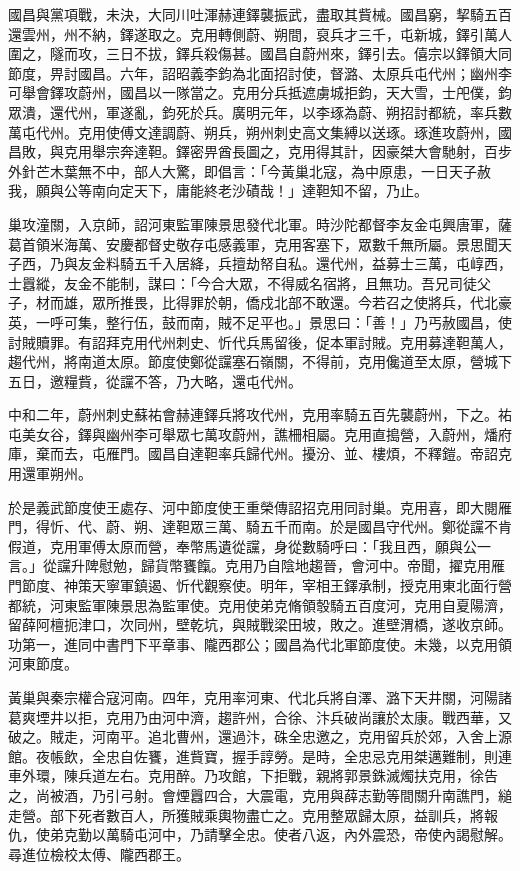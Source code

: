 \begin{pinyinscope}
 國昌與黨項戰，未決，大同川吐渾赫連鐸襲振武，盡取其貲械。國昌窮，挈騎五百還雲州，州不納，鐸遂取之。克用轉側蔚、朔間，裒兵才三千，屯新城，鐸引萬人圍之，隧而攻，三日不拔，鐸兵殺傷甚。國昌自蔚州來，鐸引去。僖宗以鐸領大同節度，畀討國昌。六年，詔昭義李鈞為北面招討使，督潞、太原兵屯代州；幽州李可舉會鐸攻蔚州，國昌以一隊當之。克用分兵抵遮虜城拒鈞，天大雪，士戺僕，鈞眾潰，還代州，軍遂亂，鈞死於兵。廣明元年，以李琢為蔚、朔招討都統，率兵數萬屯代州。克用使傅文達調蔚、朔兵，朔州刺史高文集縛以送琢。琢進攻蔚州，國昌敗，與克用舉宗奔達靼。鐸密畀酋長圖之，克用得其計，因豪桀大會馳射，百步外針芒木葉無不中，部人大驚，即倡言：「今黃巢北寇，為中原患，一日天子赦我，願與公等南向定天下，庸能終老沙磧哉！」達靼知不留，乃止。



 巢攻潼關，入京師，詔河東監軍陳景思發代北軍。時沙陀都督李友金屯興唐軍，薩葛首領米海萬、安慶都督史敬存屯感義軍，克用客塞下，眾數千無所屬。景思聞天子西，乃與友金料騎五千入居絳，兵擅劫帑自私。還代州，益募士三萬，屯崞西，士囂縱，友金不能制，謀曰：「今合大眾，不得威名宿將，且無功。吾兄司徒父子，材而雄，眾所推畏，比得罪於朝，僑戍北部不敢還。今若召之使將兵，代北豪英，一呼可集，整行伍，鼓而南，賊不足平也。」景思曰：「善！」乃丐赦國昌，使討賊贖罪。有詔拜克用代州刺史、忻代兵馬留後，促本軍討賊。克用募達靼萬人，趨代州，將南道太原。節度使鄭從讜塞石嶺關，不得前，克用儳道至太原，營城下五日，邀糧貲，從讜不答，乃大略，還屯代州。



 中和二年，蔚州刺史蘇祐會赫連鐸兵將攻代州，克用率騎五百先襲蔚州，下之。祐屯美女谷，鐸與幽州李可舉眾七萬攻蔚州，譙柵相屬。克用直搗營，入蔚州，燔府庫，棄而去，屯雁門。國昌自達靼率兵歸代州。擾汾、並、樓煩，不釋鎧。帝詔克用還軍朔州。



 於是義武節度使王處存、河中節度使王重榮傳詔招克用同討巢。克用喜，即大閱雁門，得忻、代、蔚、朔、達靼眾三萬、騎五千而南。於是國昌守代州。鄭從讜不肯假道，克用軍傅太原而營，奉幣馬遺從讜，身從數騎呼曰：「我且西，願與公一言。」從讜升陴慰勉，歸貨幣饔餼。克用乃自陰地趨晉，會河中。帝聞，擢克用雁門節度、神策天寧軍鎮遏、忻代觀察使。明年，宰相王鐸承制，授克用東北面行營都統，河東監軍陳景思為監軍使。克用使弟克脩領彀騎五百度河，克用自夏陽濟，留薛阿檀扼津口，次同州，壁乾坑，與賊戰梁田坡，敗之。進壁渭橋，遂收京師。功第一，進同中書門下平章事、隴西郡公；國昌為代北軍節度使。未幾，以克用領河東節度。



 黃巢與秦宗權合寇河南。四年，克用率河東、代北兵將自澤、潞下天井關，河陽諸葛爽堙井以拒，克用乃由河中濟，趨許州，合徐、汴兵破尚讓於太康。戰西華，又破之。賊走，河南平。追北曹州，還過汴，硃全忠邀之，克用留兵於郊，入舍上源館。夜帳飲，全忠自佐饔，進貲寶，握手諄勞。是時，全忠忌克用桀邁難制，則連車外環，陳兵道左右。克用醉。乃攻館，下拒戰，親將郭景銖滅燭扶克用，徐告之，尚被酒，乃引弓射。會煙囂四合，大震電，克用與薛志勤等間關升南譙門，縋走營。部下死者數百人，所獲賊乘輿物盡亡之。克用整眾歸太原，益訓兵，將報仇，使弟克勤以萬騎屯河中，乃請擊全忠。使者八返，內外震恐，帝使內謁慰解。尋進位檢校太傅、隴西郡王。




\end{pinyinscope}

